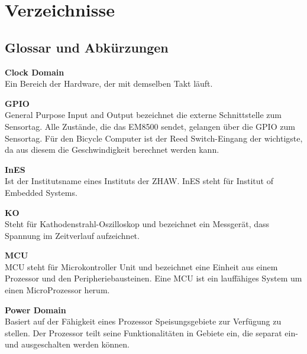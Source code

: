\chapter{Verzeichnisse}




\renewcommand{\bibsection}{\section{\refname}}  %
\makeatletter
\makeatother






\section{Glossar und Abkürzungen}\label{glossar}

\textbf{Clock Domain}\\
\forceindent Ein Bereich der Hardware, der mit demselben Takt läuft.

\textbf{GPIO}\\
\forceindent General Purpose Input and Output bezeichnet die externe Schnittstelle zum Sensortag. Alle Zustände, die das EM8500 sendet, gelangen über die GPIO zum Sensortag. Für den Bicycle Computer ist der Reed Switch-Eingang der wichtigste, da aus diesem die Geschwindigkeit berechnet werden kann.

\textbf{InES}\\
\forceindent Ist der Institutsname eines Instituts der ZHAW. InES steht für Institut of Embedded Systems.

\textbf{KO}\\
\forceindent Steht für Kathodenstrahl-Oszilloskop und bezeichnet ein Messgerät, dass Spannung im Zeitverlauf aufzeichnet.

\textbf{MCU}\\
\forceindent MCU steht für Microkontroller Unit und bezeichnet eine Einheit aus einem Prozessor und den Peripheriebausteinen. Eine MCU ist ein lauffähiges System um einen MicroProzessor herum.


\textbf{Power Domain}\\
\forceindent Basiert auf der Fähigkeit eines Prozessor Speisungsgebiete zur Verfügung zu stellen. Der Prozessor teilt seine Funktionalitäten in Gebiete ein, die separat ein- und ausgeschalten werden können.

